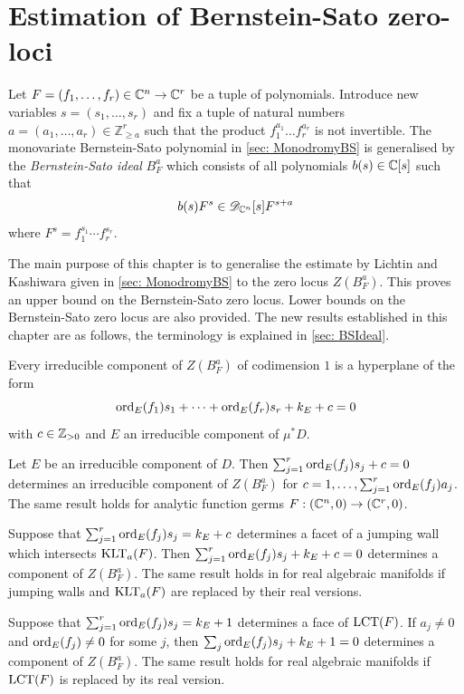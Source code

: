 \chapter{Estimation of Bernstein-Sato zero-loci}\label{ch: ChapterRelHol}
Let $F = (f_1,\ldots,f_r)\in \mathbb{C}^n\to \mathbb{C}^r$ be a tuple of polynomials.
Introduce new variables $s = (s_1,\ldots, s_r)$ and fix a tuple of natural numbers $a = (a_1,\ldots, a_r) \in \mathbb{Z}_{\geq a}^r$ such that the product $f_1^{a_1}\ldots f_r^{a_r}$ is not invertible.
The monovariate Bernstein-Sato polynomial in \cref{sec: MonodromyBS} is generalised by the {\it Bernstein-Sato ideal} $B_F^{a}$ which consists of all polynomials $b(s)\in \mathbb{C}[s]$ such that
$$b(s) F^s \in \mathscr{D}_{\mathbb{C}^n}[s]F^{s+a}$$
where $F^s = f_1^{s_1}\cdots f_r^{s_r}$.

The main purpose of this chapter is to generalise the estimate by Lichtin and Kashiwara given in \cref{sec: MonodromyBS} to the zero locus $Z(B_F^a)$.
This proves an upper bound on the Bernstein-Sato zero locus. 
Lower bounds on the Bernstein-Sato zero locus are also provided. 
The new results established in this chapter are as follows, the terminology is explained in \cref{sec: BSIdeal}.
\begin{result}
 Every irreducible component of $Z(B_F^a)$ of codimension $1$ is a hyperplane of the form
  $$\operatorname{ord}_{E}(f_1)s_1 + \cdots + \operatorname{ord}_{E}(f_r)s_r + k_E + c=0 $$
with $c\in\mathbb{Z}_{>0}$ and $E$ an irreducible component of $\mu^*D$.
\end{result}
 \begin{result}
  Let $E$ be an irreducible component of $D$.
  Then $\sum_{j=1}^r \operatorname{ord}_{E}(f_j)s_j + c = 0$ determines an irreducible component of $Z(B_F^a)$ for $c = 1,\ldots, \sum_{j=1}^{r}\operatorname{ord}_{E}(f_j)a_j$.
  The same result holds for analytic function germs $F:(\mathbb{C}^n,0)\to (\mathbb{C}^r,0)$. 
 \end{result}
 \begin{result}
     Suppose that $\sum_{j=1}^r \operatorname{ord}_E(f_j)s_j = k_E + c$ determines a facet of a jumping wall which intersects $\operatorname{KLT}_{a}(F)$.
    Then $\sum_{j=1}^r \operatorname{ord}_E(f_j)s_j + k_E + c = 0$ determines a component of $Z(B_F^a)$. The same result holds in for real algebraic manifolds if jumping walls and $\operatorname{KLT}_a(F)$ are replaced by their real versions. 
 \end{result}
 \begin{result}
     Suppose that $\sum_{j=1}^r \operatorname{ord}_E(f_j)s_j = k_E + 1$ determines a face of $\operatorname{LCT}(F)$. If $a_j\neq 0$ and $\operatorname{ord}_{E}(f_j)\neq 0$ for some $j$, then $\sum_j \operatorname{ord}_{E}(f_j)s_j +k_E + 1=0$ determines a component of $Z(B_F^a)$.
     The same result holds for real algebraic manifolds if $\operatorname{LCT}(F)$ is replaced by its real version. 
 \end{result}
